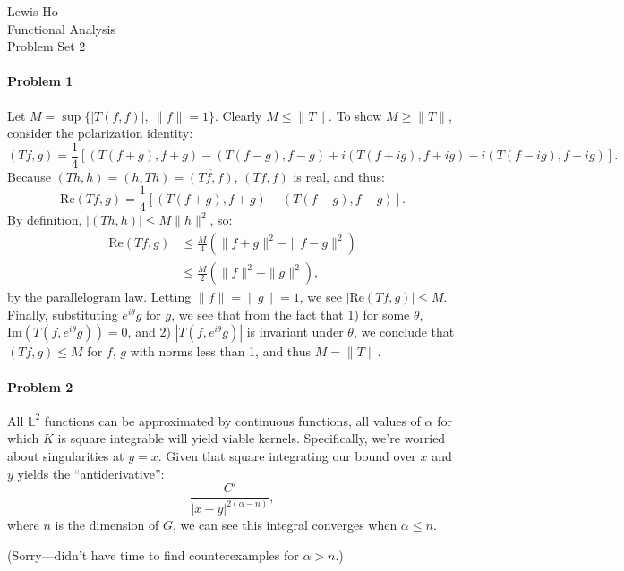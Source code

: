\documentclass[12pt]{article}
\begin{document}
\begin{center}
  Lewis Ho\\
  Functional Analysis\\
  Problem Set 2
\end{center}

\paragraph{Problem 1}
Let $M = \sup\{|T(f,f)|,\ \|f\| = 1\}$. Clearly $M \leq \|T\|$. To show $M \geq
\|T\|$, consider the polarization identity:
\begin{displaymath}
  (Tf, g) = \frac{1}{4}[(T(f+g),f+g)-(T(f-g),f-g)+i(T(f+ig),f+ig)-i(T(f-ig),
  f-ig)].
\end{displaymath}
Because $(Th,h) = (h,Th) = \overline{(Tf,f)}$, $(Tf,f)$ is real, and thus:
\begin{displaymath}
  \text{Re}(Tf,g) = \frac{1}{4}[(T(f+g),f+g)- (T(f-g),f-g)].
\end{displaymath}
By definition, $|(Th,h)|\leq M\|h\|^2$, so:
\begin{align*}
  \text{Re}(Tf,g) &\leq \frac{M}{4}(\|f+g\|^2 - \|f-g\|^2)\\
  & \leq \frac{M}{2}(\|f\|^2 + \|g\|^2),
\end{align*}
by the parallelogram law. Letting $\|f\| = \|g\| = 1$, we see $|\text{Re}(Tf,g)
| \leq M$. Finally, substituting $e^{i\theta}g$ for $g$, we see that from the fact
that 1) for some $\theta$, $\text{Im}(T(f, e^{i\theta}g)) = 0$, and 2) $|T(f, e^
{i\theta}g)|$ is invariant under $\theta$, we conclude that $(Tf, g) \leq M$ for
$f$, $g$ with norms less than 1, and thus $M = \|T\|$.

\paragraph{Problem 2}
All $\mathbb{L}^2$ functions can be approximated by continuous functions, all
values of $\alpha$ for which $K$ is square integrable will yield viable kernels.
Specifically, we're worried about singularities at $y=x$. Given that square
integrating our bound over $x$ and $y$ yields the ``antiderivative'':
\begin{displaymath}
  \frac{C'}{|x-y|^{2(\alpha - n)}},
\end{displaymath}
where $n$ is the dimension of $G$, we can see this integral converges when
$\alpha \leq n$.

(Sorry---didn't have time to find counterexamples for $\alpha > n$.)
\end{document}
